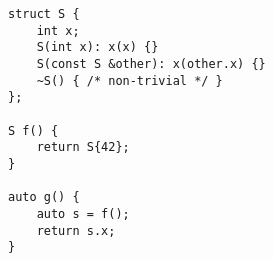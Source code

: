 \begin{lstlisting}[title=\href{https://godbolt.org/z/LY5mZK}{\texttt{godbolt.org/z/LY5mZK}}]
struct S {
    int x;
    S(int x): x(x) {}
    S(const S &other): x(other.x) {}
    ~S() { /* non-trivial */ }
};

S f() {
    return S{42};
}

auto g() {
    auto s = f();
    return s.x;
}
\end{lstlisting}

